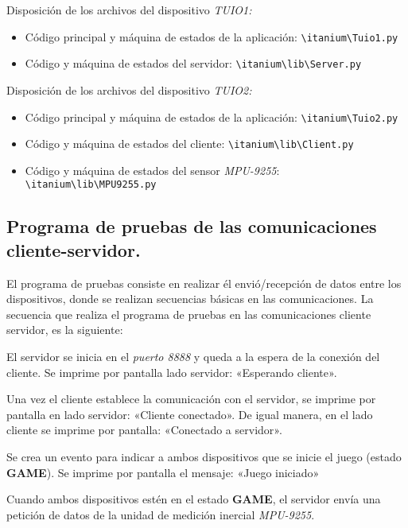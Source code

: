 Disposición de los archivos del dispositivo \emph{TUIO1:}
\begin{itemize}
\item Código principal y máquina de estados de la aplicación: \texttt{\textbackslash itanium\textbackslash Tuio1.py}
\item Código y máquina de estados del servidor: \texttt{\textbackslash itanium\textbackslash lib\textbackslash Server.py}
\end{itemize} 

Disposición de los archivos del dispositivo \emph{TUIO2:}
\begin{itemize}
\item Código principal y máquina de estados de la aplicación: \texttt{\textbackslash itanium\textbackslash Tuio2.py}
\item Código y máquina de estados del cliente: \texttt{\textbackslash itanium\textbackslash lib\textbackslash Client.py}
\item Código y máquina de estados del sensor \emph{MPU-9255}: \texttt{\textbackslash itanium\textbackslash lib\textbackslash MPU9255.py}
\end{itemize}

\subsection{Programa de pruebas de las comunicaciones cliente-servidor.}

El programa de pruebas consiste en realizar él envió/recepción de datos entre los dispositivos, donde se realizan secuencias básicas en las comunicaciones.
La secuencia que realiza el programa de pruebas en las comunicaciones cliente servidor, es la siguiente:

El servidor se inicia en el \emph{puerto 8888} y queda a la espera de la conexión del cliente. Se imprime por pantalla lado servidor: «Esperando cliente». 

Una vez el cliente establece la comunicación con el servidor, se imprime por pantalla en lado servidor: «Cliente conectado». De igual manera, en el lado cliente se imprime por pantalla: «Conectado a servidor».

Se crea un evento para indicar a ambos dispositivos que se inicie el juego (estado \textbf{GAME}). Se imprime por pantalla el mensaje: «Juego iniciado»

Cuando ambos dispositivos estén en el estado \textbf{GAME}, el servidor envía una petición de datos de la unidad de medición inercial \emph{MPU-9255}.

